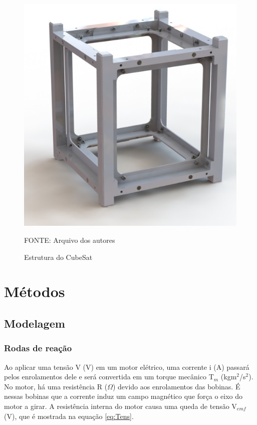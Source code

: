 \documentclass[
	12pt,				%
	openany,			%
	twoside,			%
	a4paper,			%
	english,			%
	french,				%
	spanish,			%
	brazil,				%
	oldfontcommands
	]{abntex2}
\begin{document}
\begin{figure}[th]
	\caption{Estrutura do CubeSat}
	\centering
	\includegraphics[width=0.7\linewidth]{./figs/Frame}
	
	\begin{small}
		FONTE: Arquivo dos autores
	\end{small}
	\label{fig:Frame}
\end{figure}

\newpage

\section[Métodos]{Métodos}



\subsection{Modelagem}



\subsubsection{Rodas de reação}

Ao aplicar uma tensão V (V) em um motor elétrico, uma corrente i (A) passará pelos enrolamentos dele e será convertida em um torque mecânico T$_{m}$ (kgm$^{2}$/s$^{2}$). No motor, há uma resistência R ($\Omega$) devido aos enrolamentos das bobinas. É nessas bobinas que a corrente induz um campo magnético que força o eixo do motor a girar. A resistência interna do motor causa uma queda de tensão V$_{emf}$ (V), que é mostrada na equação \ref{eq:Tens}.
\end{document}
